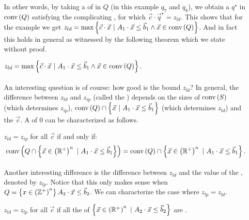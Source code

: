 In other words, by taking a  of  in $Q$ (in this example $q_7$ and $q_8$), we obtain a  $q^{\star}$ in $\mbox{conv}\left( Q \right)$ satisfying the complicating , for which $\vec{c}\cdot\vec{q}^{\star}=z_{ld}$. This shows that for the example we get $z_{ld}=\max\left\{ \vec{c}\cdot\vec{x}\ |\ A_1\cdot\vec{x}\leq\vec{b}_1\wedge\vec{x}\in\mbox{conv}\left( Q \right) \right\}$. And in fact this holds in general as witnessed by the following theorem which we state without proof.

\begin{theorem}
$z_{ld}=\max\left\{ \vec{c}\cdot\vec{x}\ |\ A_1\cdot\vec{x}\leq\vec{b}_1\wedge\vec{x}\in\mbox{conv}\left( Q \right) \right\}$.
\end{theorem}

\paragraph{}
An interesting question is of course: how good is the bound $z_{ld}$? In general, the difference between $z_{ld}$ and $z_{ip}$ (called the ) depends on the sizes of $\mbox{conv}\left( S \right)$ (which determines $z_{ip}$), $\mbox{conv}\left( Q \right)\cap\left\{ \vec{x}\ |\ A_1\cdot\vec{x}\leq\vec{b}_1 \right\}$ (which determines $z_{ld}$) and the  $\vec{c}$. A  of $0$ can be characterized as follows.

\begin{theorem}
$z_{ld}=z_{ip}$ for all $\vec{c}$ if and only if:
\begin{equation}
\mbox{conv}\left( Q\cap\left\{ \vec{x}\in\left( \mathbb{R}^+ \right)^n\ |\ A_1\cdot\vec{x}\leq\vec{b}_1 \right\} \right)=\mbox{conv}\left( Q \right)\cap\left\{ \vec{x}\in\left( \mathbb{R}^+ \right)^n\ |\ A_1\cdot\vec{x}\leq\vec{b}_1 \right\}.
\end{equation}
\end{theorem}

\paragraph{}
Another interesting difference is the difference between $z_{ld}$ and the value of the , denoted by $z_{lp}$. Notice that this only makes sense when $Q=\left\{ x\in\left( \mathbb{Z}^+ \right)^n
 \right\}{A_2\cdot\vec{x}\leq\vec{b}_2}$. We can characterize the case where $z_{lp}=z_{ld}$.

\begin{theorem}
$z_{ld}=z_{lp}$ for all $\vec{c}$ if all the  of $\left\{ \vec{x}\in\left( \mathbb{R}^+ \right)^n\ |\ A_2\cdot\vec{x}\leq\vec{b}_2 \right\}$ are .
\end{theorem}

